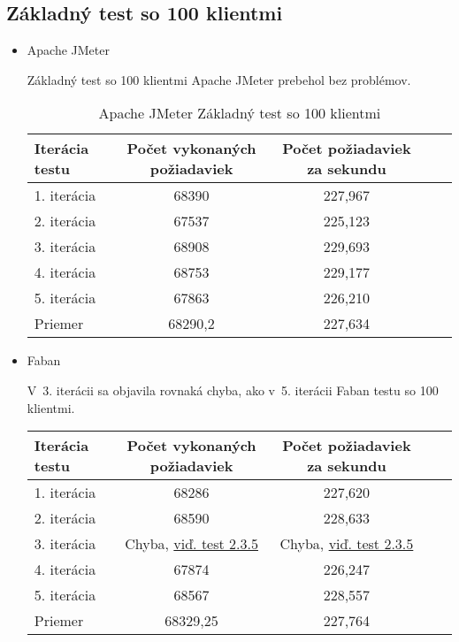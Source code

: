 \documentclass[12pt,oneside,final]{fithesis-utf8}
\begin{document}
\subsection{Základný test so 100 klientmi}

\begin{itemize}

\item Apache JMeter

Základný test so 100 klientmi Apache JMeter prebehol bez problémov.

\begin{table}[H]
\begin{center}
\begin{tabular}{ | l | c | c | c | c |}
		\hline
		 \textbf{Iterácia testu} & \textbf{Počet vykonaných požiadaviek} & \textbf{Počet požiadaviek za sekundu} \\ \hline
		 1. iterácia & 68390 & 227,967 \\ \hline
		 2. iterácia & 67537 & 225,123 \\ \hline
		 3. iterácia & 68908 & 229,693 \\ \hline
		 4. iterácia & 68753 & 229,177 \\ \hline
		 5. iterácia & 67863 & 226,210 \\ \hline
		 Priemer & 68290,2 & 227,634 \\ \hline
		 
\end{tabular}
\end{center}
\caption{Apache JMeter Základný test so 100 klientmi}
\end{table}


\item Faban

V~3. iterácii sa objavila rovnaká chyba, ako v~5. iterácii Faban testu so 100 klientmi. 

\begin{table}[H]
\begin{center}
\begin{tabular}{ | l | c | c | c | c |}
		\hline
		 \textbf{Iterácia testu} & \textbf{Počet vykonaných požiadaviek} & \textbf{Počet požiadaviek za sekundu} \\ \hline
		 1. iterácia & 68286 & 227,620 \\ \hline
		 2. iterácia & 68590 & 228,633 \\ \hline
		 3. iterácia & Chyba, \hyperlink{label}{viď. test 2.3.5} & Chyba, \hyperlink{label}{viď. test 2.3.5} \\ \hline
		 4. iterácia & 67874 & 226,247 \\ \hline
		 5. iterácia & 68567 & 228,557 \\ \hline
		 Priemer & 68329,25 & 227,764 \\ \hline
		 

\end{tabular}
\end{center}
\end{table}
\end{itemize}
\end{document}
